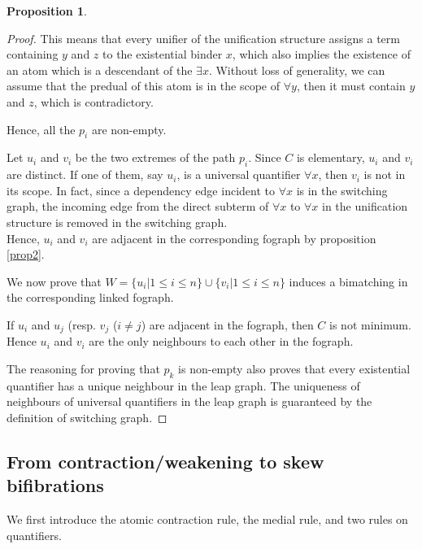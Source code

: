 \documentclass{article}
\theoremstyle{definition}
\newtheorem{proposition}[thm]{Proposition}
\begin{document}
\begin{proposition}
\begin{proof}
This means that every unifier of the unification structure assigns a term
containing $y$ and $z$ to the existential binder $x$, which also implies
the existence of an atom which is a descendant of the $\exists x$. Without loss of
generality, we can assume that the predual of this atom is in the scope
of $\forall y$, then it must contain $y$ and $z$, which is contradictory.

Hence, all the $p_i$ are non-empty.

Let $u_i$ and $v_i$ be the two extremes of the path $p_i$. Since $C$ is
elementary, $u_i$ and $v_i$ are distinct. If one of them, say $u_i$, is a
universal quantifier $\forall x$, then $v_i$ is not in its scope. In fact, since a
dependency edge incident to $\forall x$ is in the switching graph, the
incoming edge from the direct subterm of $\forall x$ to $\forall x$ in the
unification structure is removed in the switching graph.\\
Hence, $u_i$ and $v_i$ are adjacent in the corresponding fograph by proposition
\ref{prop2}.

We now prove that $W = \{u_i | 1 \leq i \leq n \} \cup \{v_i | 1 \leq i \leq n \}$ induces a bimatching in the corresponding linked fograph.

If $u_i$ and $u_j$ (resp. $v_j$ ($i \neq j$) are adjacent in the fograph, then $C$ is not minimum. Hence $u_i$ and $v_i$ are the only neighbours to each other in the fograph.

The reasoning for proving that $p_k$ is non-empty also proves that every existential quantifier has a unique neighbour in the leap graph. The uniqueness of neighbours of universal quantifiers in the leap graph is guaranteed by the definition of switching graph.

\end{proof}
\fi
\end{proposition}

\subsection{From contraction/weakening to skew bifibrations}

We first introduce the atomic contraction rule, the medial rule, and two rules
on quantifiers.
\end{document}
